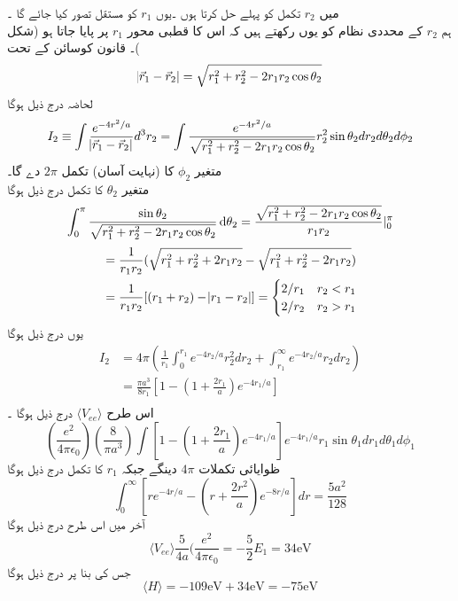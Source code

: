 میں 
\(r_{2}\)
 تکمل کو پہلے حل کرتا ہوں ۔یوں
 \(r_{1}\)
کو مستقل تصور کیا جائے گا ۔\\
ہم 
\(r_{2}\)
کے محددی نظام کو یوں رکھتے ہیں کہ اس کا قطبی محور
 \(r_{1}\)
پر پایا جاتا ہو (شکل )۔
قانون کوسائن کے تحت 
\[\abs{\vec{r}_{1}-\vec{r}_{2}}=\sqrt{r_{1}^{2}+r_{2}^{2}-2r_{1}r_{2}\cos{\theta_{2}}}\]
لحاضہ درج ذیل ہوگا \\
\[I_{2}\equiv\int\frac{e^{-4r^{2}/a}}{\abs{\vec{r}_{1}-\vec{r}_{2}}}d^{3}r_{2}=\int\frac{e^{-4r^{2}/a}}{\sqrt{r_{1}^{2}+r_{2}^{2}-2r_{1}r_{2}\cos{\theta_{2}}}}r_{2}^{2}\sin{\theta_{2}}dr_{2}d\theta_{2}d\phi_{2}\]
متغیر 
\(\phi_{2}\)
کا (نہایت آسان) تکمل 
\(2\pi\)
 دے گا۔\\
متغیر 
\(\theta_{2}\)
 کا تکمل درج ذیل ہوگا
\begin{align*}
\int_{0}^{\pi}\frac{\sin{\theta_{2}}}{\sqrt{r_{1}^{2}+r_{2}^{2}-2r_{1}r_{2}\cos{\theta_{2}}}}\dif{\theta_{2}}=\frac{\sqrt{r_{1}^{2}+r_{2}^{2}-2r_{1}r_{2}\cos{\theta_{2}}}}{r_{1}r_{2}}|_{0}^{\pi}
\end{align*}
\begin{align*}
&=\frac{1}{r_{1}r_{2}}(\sqrt{r_{1}^{2}+r_{2}^{2}+2r_{1}r_{2}}-\sqrt{r_{1}^{2}+r_{2}^{2}-2r_{1}r_{2}})\\
&=\frac{1}{r_{1}r_{2}}[(r_{1}+r_{2})-\abs{r_{1}-r_{2}}]=\begin{cases}
2/r_{1} & r_{2}<r_{1}\\
2/r_{2}&r_{2}>r_{1}\\
\end{cases}\\
\end{align*}
یوں درج ذیل ہوگا 
\begin{align*}
I_{2}&=4\pi(\frac{1}{r_{1}}\int_{0}^{r_{1}}e^{-4r_{2}/a}r_{2}^{2}dr_{2}+\int_{r_{1}}^{\infty}e^{-4r_{2}/a}r_{2}dr_{2})\\
&=\frac{\pi a^{3}}{8r_{1}}[1-(1+\frac{2r_{1}}{a})e^{-4r_{1}/a}]\\
\end{align*}
اس طرح 
\(\langle V_{ee} \rangle \)
درج ذیل ہوگا ۔
\[(\frac{e^{2}}{4\pi\epsilon_{0}})(\frac{8}{\pi a^{3}})\int[1-(1+\frac{2r_{1}}{a})e^{-4r_{1}/a}]e^{-4r_{1}/a}r_{1}\sin{\theta_{1}}dr_{1}d\theta_{1}d\phi_{1}\]
ظوایائی تکملات 
\(4\pi\)
دینگے جبکہ 
\(r_{1}\)
 کا تکمل درج ذیل ہوگا
\[\int_{0}^{\infty}[re^{-4r/a}-(r+\frac{2r^{2}}{a})e^{-8r/a}]dr=\frac{5a^{2}}{128}\]
آخر میں اس طرح درج ذیل ہوگا 
\[\langle V_{ee} \rangle\frac{5}{4a}(\frac{e^{2}}{4\pi\epsilon_{0}}=-\frac{5}{2}E_{1}=34\text{eV}\]
جس کی بنا پر درج ذیل ہوگا 
\[\langle H \rangle =-109 \text{eV}+34 \text{eV}=-75\text{eV}\]
